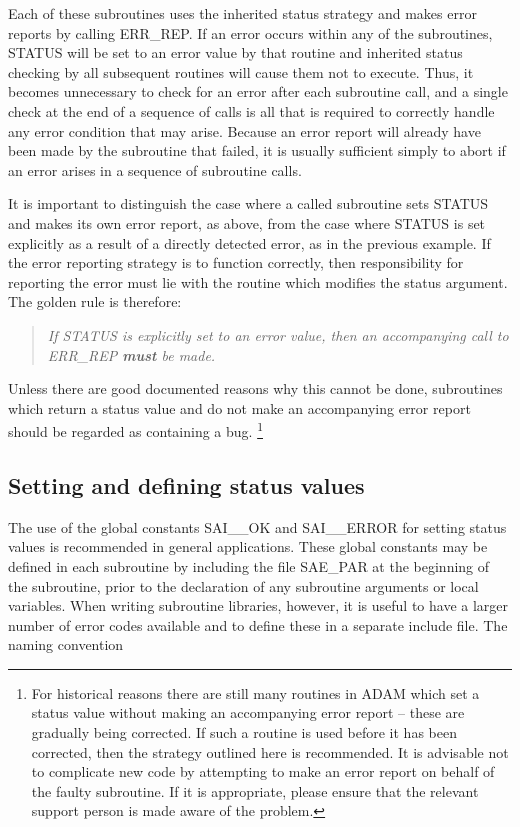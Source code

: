 Each of these subroutines uses the inherited status strategy and makes 
error reports by calling ERR\_REP.
If an error occurs within any of the subroutines, STATUS will be set 
to an error value by that routine and inherited status checking by all
subsequent routines will cause them not to execute. 
Thus, it becomes unnecessary to check for an error after each subroutine
call, and a single check at the end of a sequence of calls is all that is
required to correctly handle any error condition that may arise. 
Because an error report will already have been made by the subroutine that
failed, it is usually sufficient simply to abort if an error arises in a
sequence of subroutine calls.

It is important to distinguish the case where a called subroutine sets STATUS 
and makes its own error report, as above, from the case where STATUS is set 
explicitly as a result of a directly detected error, as in the previous
example.
If the error reporting strategy is to function correctly, then responsibility 
for reporting the error must lie with the routine which modifies the status 
argument.
The golden rule is therefore:

\begin {quote}
{\em If STATUS is explicitly set to an error value, then an accompanying
call to ERR\_REP {\bf must} be made.} 
\end {quote}

Unless there are good documented reasons why this cannot be done,
subroutines which return a status value and do not make an accompanying
error report should be regarded as containing a bug.
\footnote{For historical reasons there are still many routines in ADAM which
set a status value without making an accompanying error report -- these are
gradually being corrected. 
If such a routine is used before it has been corrected, then the strategy 
outlined here is recommended.
It is advisable not to complicate new code by attempting to make an error
report on behalf of the faulty subroutine.
If it is appropriate, please ensure that the relevant support person is made
aware of the problem.} 


\subsection {Setting and defining status values}

The use of the global constants SAI\_\_OK and SAI\_\_ERROR for setting
status values is recommended in general applications. 
These global constants may be defined in each subroutine by including the
file SAE\_PAR at the beginning of the subroutine, prior to the declaration
of any subroutine arguments or local variables. 
When writing subroutine libraries, however, it is useful to have a larger 
number of error codes available and to define these in a separate include 
file.
The naming convention 

